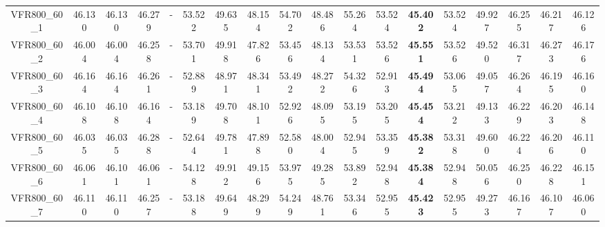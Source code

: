 \begin{tabular}{cc|ccc|ccccccccccccc}
VFR800\_60\_1      & 46.130           & 46.130           & 46.279           & -                & 53.522           & 49.635           & 48.154           & 54.702           & 48.486           & 55.264           & 53.524           & {\bf 45.402}     & 53.524           & 49.927           & 46.255           & 46.217           & 46.126          \\ 
VFR800\_60\_2      & 46.004           & 46.004           & 46.258           & -                & 53.701           & 49.918           & 47.826           & 53.456           & 48.134           & 53.531           & 53.526           & {\bf 45.551}     & 53.526           & 49.520           & 46.317           & 46.273           & 46.176          \\ 
VFR800\_60\_3      & 46.164           & 46.164           & 46.261           & -                & 52.889           & 48.971           & 48.341           & 53.492           & 48.272           & 54.326           & 52.913           & {\bf 45.494}     & 53.065           & 49.057           & 46.264           & 46.195           & 46.160          \\ 
VFR800\_60\_4      & 46.108           & 46.108           & 46.164           & -                & 53.189           & 49.708           & 48.101           & 52.926           & 48.095           & 53.195           & 53.205           & {\bf 45.454}     & 53.212           & 49.133           & 46.229           & 46.203           & 46.148          \\ 
VFR800\_60\_5      & 46.035           & 46.035           & 46.288           & -                & 52.644           & 49.781           & 47.898           & 52.580           & 48.004           & 52.945           & 53.359           & {\bf 45.382}     & 53.318           & 49.600           & 46.224           & 46.206           & 46.110          \\ 
VFR800\_60\_6      & 46.061           & 46.101           & 46.061           & -                & 54.128           & 49.912           & 49.156           & 53.975           & 49.285           & 53.892           & 52.948           & {\bf 45.384}     & 52.948           & 50.056           & 46.250           & 46.228           & 46.151          \\ 
VFR800\_60\_7      & 46.110           & 46.110           & 46.257           & -                & 53.188           & 49.649           & 48.299           & 54.249           & 48.761           & 53.346           & 52.955           & {\bf 45.423}     & 52.955           & 49.273           & 46.167           & 46.107           & 46.060          \\ 

\end{tabular}
